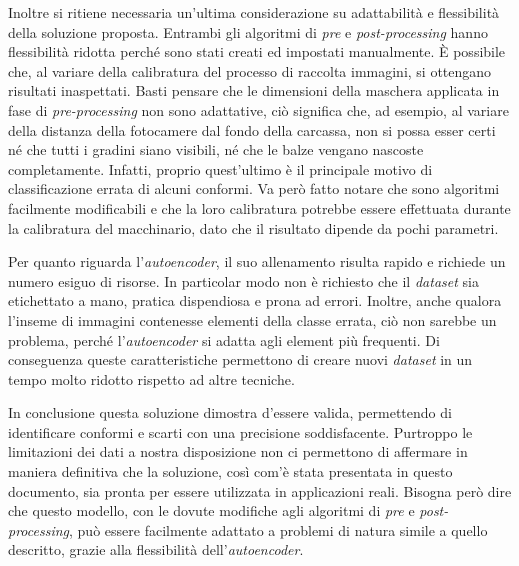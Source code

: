 Inoltre si ritiene necessaria un'ultima considerazione su adattabilità e flessibilità della soluzione proposta.
Entrambi gli algoritmi di \textit{pre} e \textit{post-processing} hanno flessibilità ridotta perché sono stati creati ed impostati manualmente.
È possibile che, al variare della calibratura del processo di raccolta immagini, si ottengano risultati inaspettati.
Basti pensare che le dimensioni della maschera applicata in fase di \textit{pre-processing} non sono adattative, ciò significa che, ad esempio, al variare della distanza della fotocamere dal fondo della carcassa, non si possa esser certi né che tutti i gradini siano visibili, né che le balze vengano nascoste completamente.
Infatti, proprio quest'ultimo è il principale motivo di classificazione errata di alcuni conformi.
Va però fatto notare che sono algoritmi facilmente modificabili e che la loro calibratura potrebbe essere effettuata durante la calibratura del macchinario, dato che il risultato dipende da pochi parametri.

Per quanto riguarda l'\textit{autoencoder}, il suo allenamento risulta rapido e richiede un numero esiguo di risorse.
In particolar modo non è richiesto che il \textit{dataset} sia etichettato a mano, pratica dispendiosa e prona ad errori.
Inoltre, anche qualora l'inseme di immagini contenesse elementi della classe errata, ciò non sarebbe un problema, perché l'\textit{autoencoder} si adatta agli element più frequenti.
Di conseguenza queste caratteristiche permettono di creare nuovi \textit{dataset} in un tempo molto ridotto rispetto ad altre tecniche.

In conclusione questa soluzione dimostra d'essere valida, permettendo di identificare conformi e scarti con una precisione soddisfacente.
Purtroppo le limitazioni dei dati a nostra disposizione non ci permettono di affermare in maniera definitiva che la soluzione, così com'è stata presentata in questo documento, sia pronta per essere utilizzata in applicazioni reali.
Bisogna però dire che questo modello, con le dovute modifiche agli algoritmi di \textit{pre} e \textit{post-processing}, può essere facilmente adattato a problemi di natura simile a quello descritto, grazie alla flessibilità dell'\textit{autoencoder}.


